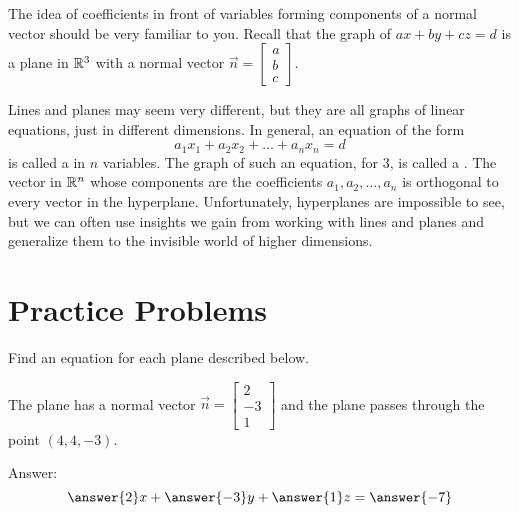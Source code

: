 \documentclass{ximera}
\begin{document}
 
 
\begin{onlineOnly}
\begin{center}
\end{center}
\end{onlineOnly}
 
The idea of coefficients in front of variables forming components of a normal vector should be very familiar to you.  Recall that the graph of $ax+by+cz=d$ is a plane in $\mathbb{R}^3$ with a normal vector $\vec{n}=\begin{bmatrix}a\\b\\c\end{bmatrix}$.


 
Lines and planes may seem very different, but they are all graphs of linear equations, just in different dimensions.  In general, an equation of the form
$$a_1x_1+a_2x_2+\dots +a_nx_n=d$$
is called a  in $n$ variables.  The graph of such an equation, for $3$, is called a .  The vector in $\mathbb{R}^n$ whose components are the coefficients $a_1, a_2, \dots ,a_n$ is orthogonal to every vector in the hyperplane.  Unfortunately, hyperplanes are impossible to see, but we can often use insights we gain from working with lines and planes and generalize them to the invisible world of higher dimensions.



 
\section*{Practice Problems}
 
Find an equation for each plane described below.
 
  \begin{problem}\label{prob:eqplane1}
  The plane has a normal vector $\vec{n}=\begin{bmatrix}2\\-3\\1\end{bmatrix}$ and the plane passes through the point $(4, 4, -3)$.
   
  Answer: $$\answer{2}x+\answer{-3}y+\answer{1}z=\answer{-7}$$
  \end{problem}
   
\end{document}
